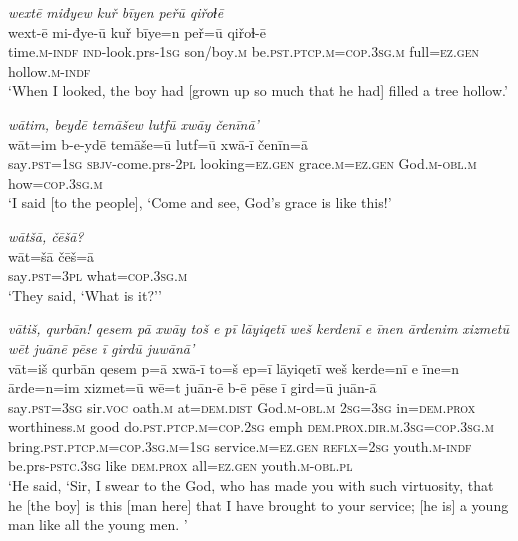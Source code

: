 \ea \label{ZQ.45}
\textit{wextē miđyew kuř bīyen peřū qiřoɫē} \\ 
\gll wext-ē mi-đye-ū kuř bīye=n peř=ū qiřoɫ-ē \\ 
 time\textsc{.m}\textsc{-indf} \textsc{ind-}look.prs\textsc{-\textsc{1sg}} son/boy\textsc{.m} be\textsc{.pst}\textsc{.ptcp}\textsc{.m}\textsc{=cop}\textsc{.3sg}\textsc{.m} full\textsc{=ez.gen} hollow\textsc{.m}\textsc{-indf} \\ 
\glt `When I looked, the boy had [grown up so much that he had] filled a tree hollow.'
\z 
 
\ea \label{ZQ.46}
\textit{wātim, beydē temāšew lutfū xwāy čenīnā’} \\ 
\gll wāt=im b-e-ydē temāše=ū lutf=ū xwā-ī čenīn=ā \\ 
 say\textsc{.pst}\textsc{=\textsc{1sg}} \textsc{sbjv-}come.prs-\textsc{2pl} looking\textsc{=ez.gen} grace\textsc{.m}\textsc{=ez.gen} God\textsc{.m}\textsc{-obl}\textsc{.m} how\textsc{=cop}\textsc{.3sg}\textsc{.m} \\ 
\glt `I said [to the people], ‘Come and see, God’s grace is like this!'
\z 
 
\ea \label{ZQ.47}
\textit{wātšā, čēšā?} \\ 
\gll wāt=šā čēš=ā \\ 
 say\textsc{.pst}\textsc{=3pl} what\textsc{=cop}\textsc{.3sg}\textsc{.m} \\ 
\glt `They said, ‘What is it?’'
\z 
 
\ea \label{ZQ.54}
\textit{vātiš, qurbān! qesem pā xwāy toš e pī lāyiqetī weš kerdenī e īnen ārdenim xizmetū wēt juānē pēse ī girdū juwānā’} \\ 
\gll vāt=iš qurbān qesem p=ā xwā-ī to=š ep=ī lāyiqetī weš kerde=nī e īne=n ārde=n=im xizmet=ū wē=t juān-ē b-ē pēse ī gird=ū juān-ā \\ 
 say\textsc{.pst}\textsc{=3sg} sir.\textsc{voc} oath\textsc{.m} at=\textsc{dem.dist} God\textsc{.m}\textsc{-obl}\textsc{.m} \textsc{2sg}\textsc{=3sg} in=\textsc{dem.prox} worthiness\textsc{.m} good do\textsc{.pst}\textsc{.ptcp}\textsc{.m}\textsc{=cop}\textsc{.\textsc{2sg}} emph \textsc{dem.prox}\textsc{.dir}\textsc{.m}\textsc{.3sg}\textsc{=cop}\textsc{.3sg}\textsc{.m} bring\textsc{.pst}\textsc{.ptcp}\textsc{.m}\textsc{=cop}\textsc{.3sg}\textsc{.m}\textsc{=\textsc{1sg}} service\textsc{.m}\textsc{=ez.gen} \textsc{reflx}\textsc{=\textsc{2sg}} youth\textsc{.m}\textsc{-indf} be.prs\textsc{-pstc}\textsc{.3sg} like \textsc{dem.prox} all\textsc{=ez.gen} youth\textsc{.m}\textsc{-obl}\textsc{.pl} \\ 
\glt `He said, ‘Sir, I swear to the God, who has made you with such virtuosity, that he [the boy] is this [man here] that I have brought to your service; [he is] a young man like all the young men. '
\z 
 
